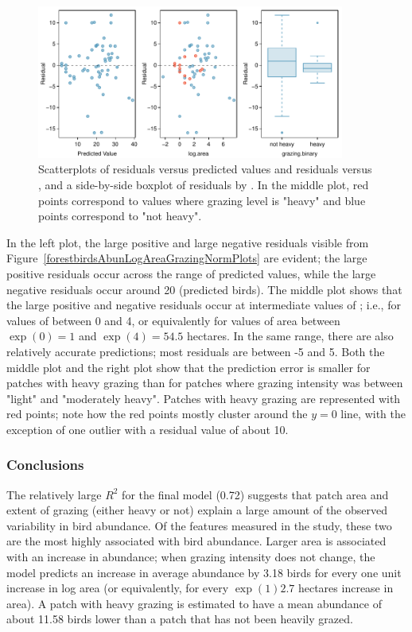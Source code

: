 \begin{figure}[h!]
	\centering
	\includegraphics[width=0.9\textwidth]
	{ch_multiple_linear_regression_oi_biostat/figures/forestbirdsAbunLogAreaGrazingResidPlots/forestbirdsAbunLogAreaGrazingResidPlots.pdf}
	\caption{Scatterplots of residuals versus predicted values and residuals versus , and a side-by-side boxplot of residuals by . In the middle plot, red points correspond to values where grazing level is "heavy" and blue points correspond to "not heavy".}
	\label{forestbirdsAbunLogAreaGrazingResidPlots}
\end{figure}

In the left plot, the large positive and large negative residuals visible from Figure~\ref{forestbirdsAbunLogAreaGrazingNormPlots} are evident; the large positive residuals occur across the range of predicted values, while the large negative residuals occur around 20 (predicted birds). The middle plot shows that the large positive and negative residuals occur at intermediate values of ; i.e., for values of  between 0 and 4, or equivalently for values of area between $\exp(0) = 1$ and $\exp(4) = 54.5$ hectares. In the same range, there are also relatively accurate predictions; most residuals are between -5 and 5. Both the middle plot and the right plot show that the prediction error is smaller for patches with heavy grazing than for patches where grazing intensity was between "light" and "moderately heavy". Patches with heavy grazing are represented with red points; note how the red points mostly cluster around the $y = 0$ line, with the exception of one outlier with a residual value of about 10.

\subsubsection{Conclusions}

The relatively large $R^2$ for the final model (0.72) suggests that patch area and extent of grazing (either heavy or not) explain a large amount of the observed variability in bird abundance. Of the features measured in the study, these two are the most highly associated with bird abundance. Larger area is associated with an increase in abundance; when grazing intensity does not change, the model predicts an increase in average abundance by 3.18 birds for every one unit increase in log area (or equivalently, for every $\exp(1) 2.7$ hectares increase in area). A patch with heavy grazing is estimated to have a mean abundance of about 11.58 birds lower than a patch that has not been heavily grazed. 

